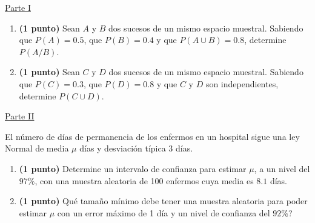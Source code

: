 
\noindent\underline{Parte I}
\begin{enumerate}[label=\alph*)]
\item \textbf{(1 punto)} Sean $A$ y $B$ dos sucesos de un mismo espacio muestral. Sabiendo que $P(A)=0.5$, que $P(B)=0.4$ y que $P(A\cup B)=0.8$, determine $P(A/B)$.
\item \textbf{(1 punto)} Sean $C$ y $D$ dos sucesos de un mismo espacio muestral. Sabiendo que $P(C)=0.3$, que $P(D)=0.8$ y que $C$ y $D$ son independientes, determine $P(C\cup D)$.
\end{enumerate}
\par\noindent\begin{minipage}{\linewidth}
\noindent\underline{Parte II}

El número de días de permanencia de los enfermos en un hospital sigue una ley Normal de media $\mu$ días y desviación típica 3 días.
\begin{enumerate}[label=\alph*)]
\item \textbf{(1 punto)} Determine un intervalo de confianza para estimar $\mu$, a un nivel del $97\%$, con una muestra aleatoria de 100 enfermos cuya media es $8.1$ días.
\item \textbf{(1 punto)} \textquestiondown{}Qué tamaño mínimo debe tener una muestra aleatoria para poder estimar $\mu$ con un error máximo de 1 día y un nivel de confianza del $92\%$?
\end{enumerate}
\end{minipage}\par
